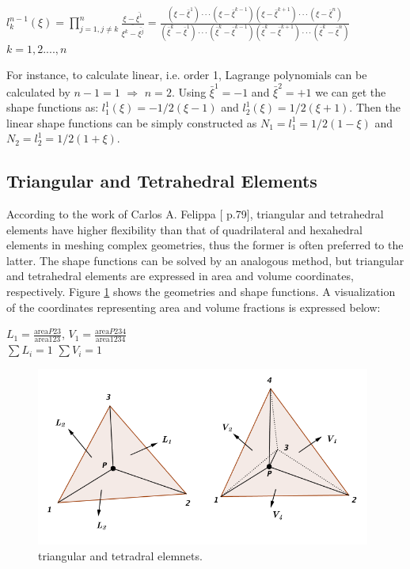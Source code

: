 \begin{center}
	$l_k^{n-1} \left( \xi \right) = \prod_{j = 1, j \neq k}^{n} \frac{\xi - \bar{\xi^1}}{\bar{\xi^k - \bar{\xi^j}}} = \frac{\left(\xi - \bar{\xi}^1\right)\cdot\cdot\cdot \left( \xi - \bar{\xi}^{k-1}\right) \left(\xi - \bar{\xi}^{k+1}\right)\cdot\cdot\cdot \left(\xi -\bar{\xi}^n\right)}{\left(\bar{\xi}^k - \bar{\xi}^1\right)\cdot\cdot\cdot \left( \bar{\xi}^k - \bar{\xi}^{k-1}\right) \left(\bar{\xi}^k - \bar{\xi}^{k+1}\right)\cdot\cdot\cdot \left(\bar{\xi}^k -\bar{\xi}^n\right)}$ \\[4mm] \quad $k = 1,2....,n$
\end{center}
For instance, to calculate linear, i.e. order 1, Lagrange polynomials can be calculated by $n-1=1$ $\Rightarrow$ $n=2$. Using $\bar{\xi}^1 = -1$ and $\bar{\xi}^2 = +1$ we can get the shape functions as: $l_1^1\left(\xi\right) = -1/2\left(\xi - 1\right)$ and $l_2^1\left(\xi\right) = 1/2\left(\xi + 1\right)$.
Then the linear shape functions can be simply constructed as $N_1 =l_1^1 = 1/2\left(1-\xi\right)$ and $N_2 = l_2^1 = 1/2\left(1+\xi\right)$.

\subsection{Triangular and Tetrahedral Elements}
According to the work of Carlos A. Felippa [\cite{Felippa} p.79], triangular and tetrahedral elements have higher flexibility than that of quadrilateral and hexahedral elements in meshing complex geometries, thus the former is often preferred to the latter. The shape functions can be solved by an analogous method, but triangular and tetrahedral elements are expressed in area and volume coordinates, respectively. Figure \ref{fig: tri&tet} shows the geometries and shape functions. A visualization of the coordinates representing area and volume fractions is expressed below:
\begin{center}
	$L_1 = \frac{\text{area}P23}{\text{area}123}$, \quad $V_1 = \frac{\text{area}P234}{\text{area}1234}$ \\[4mm]
	$\sum L_i = 1$ \quad\quad $\sum V_i = 1$
\end{center}

\begin{figure}
	\begin{center}
		\includegraphics[width=11cm,clip]{Tri&Tet.pdf}			
		\caption{triangular and tetradral elemnets.} \label{fig: tri&tet}
	\end{center}
\end{figure}

